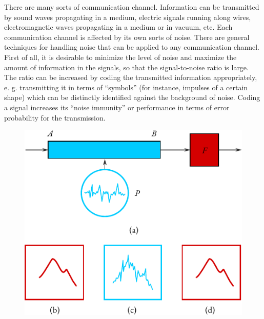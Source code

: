  There are many
sorts of communication channel. Information can be transmitted by
sound waves propagating in a medium, electric signals running along
wires, electromagnetic waves propagating in a medium or in vacuum,
etc. Each communication channel is affected by its own sorts of noise.
There are general techniques for handling noise that can be applied to
any communication channel. First of all, it is desirable to minimize the
level of noise and maximize the amount of information in the signals, so
that the signal-to-noise ratio is large. The ratio can be increased by
coding the transmitted information appropriately, e. g. transmitting it in
terms of ``symbols'' (for instance, impulses of a certain shape) which can
be distinctly identified against the background of noise. Coding a signal
increases its ``noise immunity'' or performance in terms of error
probability for the transmission.
\begin{figure}[!ht]
 \centering
 \includegraphics[width=0.8\linewidth]{figures/noise1.pdf}
 \end{figure}
 
